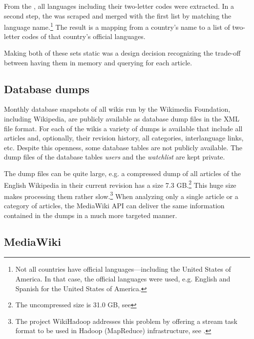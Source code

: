 \begin{description}
From the , all languages including their two-letter codes were extracted.
In a second step, the  was scraped and merged with the first list by matching the language name.\footnote{Not all countries have official languages---including the United States of America. In that case, the  official languages were used, e.g. English and Spanish for the United States of America.}
The result is a mapping from a country's name to a list of two-letter codes of that country's official languages.
\end{description}

Making both of these sets static was a design decision recognizing the trade-off between having them in memory and querying for each article.

\subsection{Database dumps}\label{sub:dumps}

Monthly database snapshots of all wikis run by the Wikimedia Foundation, including Wikipedia,  are publicly available as database dump files in the \ac{XML} file format.
For each of the wikis a variety of dumps is available that include all articles and, optionally, their revision history, all categories, interlanguage links, etc.
Despite this openness, some database tables are not publicly available.
The dump files of the database tables \emph{users} and the \emph{watchlist} are kept private.

The dump files can be quite large, e.g. a compressed dump of all articles of the English Wikipedia in their current revision has a size 7.3 GB.\footnote{The uncompressed size is 31.0 GB, see }
This huge size makes processing them rather slow.\footnote{The project WikiHadoop addresses this problem by offering a stream task format to be used in Hadoop (MapReduce) infrastructure, see .}
When analyzing only a single article or a category of articles, the MediaWiki \ac{API} can deliver the same information contained in the dumps in a much more targeted manner. 

\subsection{MediaWiki }\label{sub:mediawikiapi}

